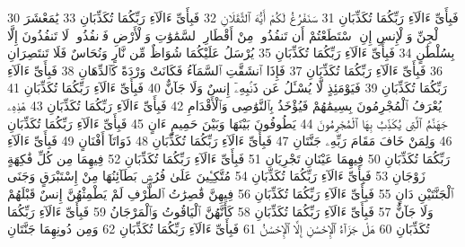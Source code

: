 {\tiny\colorbox{cl_aya}{30}} فَبِأَىِّ ءَالَآءِ رَبِّكُمَا تُكَذِّبَانِ
{\tiny\colorbox{cl_aya}{31}} سَنَفْرُغُ لَكُمْ أَيُّهَ ٱلثَّقَلَانِ
{\tiny\colorbox{cl_aya}{32}} فَبِأَىِّ ءَالَآءِ رَبِّكُمَا تُكَذِّبَانِ
{\tiny\colorbox{cl_aya}{33}} يَٰمَعْشَرَ ٱلْجِنِّ وَٱلْإِنسِ إِنِ ٱسْتَطَعْتُمْ أَن تَنفُذُوا۟ مِنْ أَقْطَارِ ٱلسَّمَٰوَٰتِ وَٱلْأَرْضِ فَٱنفُذُوا۟ لَا تَنفُذُونَ إِلَّا بِسُلْطَٰنٍ
{\tiny\colorbox{cl_aya}{34}} فَبِأَىِّ ءَالَآءِ رَبِّكُمَا تُكَذِّبَانِ
{\tiny\colorbox{cl_aya}{35}} يُرْسَلُ عَلَيْكُمَا شُوَاظٌ مِّن نَّارٍ وَنُحَاسٌ فَلَا تَنتَصِرَانِ
{\tiny\colorbox{cl_aya}{36}} فَبِأَىِّ ءَالَآءِ رَبِّكُمَا تُكَذِّبَانِ
{\tiny\colorbox{cl_aya}{37}} فَإِذَا ٱنشَقَّتِ ٱلسَّمَآءُ فَكَانَتْ وَرْدَةً كَٱلدِّهَانِ
{\tiny\colorbox{cl_aya}{38}} فَبِأَىِّ ءَالَآءِ رَبِّكُمَا تُكَذِّبَانِ
{\tiny\colorbox{cl_aya}{39}} فَيَوْمَئِذٍ لَّا يُسْـَٔلُ عَن ذَنۢبِهِۦٓ إِنسٌ وَلَا جَآنٌّ
{\tiny\colorbox{cl_aya}{40}} فَبِأَىِّ ءَالَآءِ رَبِّكُمَا تُكَذِّبَانِ
{\tiny\colorbox{cl_aya}{41}} يُعْرَفُ ٱلْمُجْرِمُونَ بِسِيمَٰهُمْ فَيُؤْخَذُ بِٱلنَّوَٰصِى وَٱلْأَقْدَامِ
{\tiny\colorbox{cl_aya}{42}} فَبِأَىِّ ءَالَآءِ رَبِّكُمَا تُكَذِّبَانِ
{\tiny\colorbox{cl_aya}{43}} هَٰذِهِۦ جَهَنَّمُ ٱلَّتِى يُكَذِّبُ بِهَا ٱلْمُجْرِمُونَ
{\tiny\colorbox{cl_aya}{44}} يَطُوفُونَ بَيْنَهَا وَبَيْنَ حَمِيمٍ ءَانٍ
{\tiny\colorbox{cl_aya}{45}} فَبِأَىِّ ءَالَآءِ رَبِّكُمَا تُكَذِّبَانِ
{\tiny\colorbox{cl_aya}{46}} وَلِمَنْ خَافَ مَقَامَ رَبِّهِۦ جَنَّتَانِ
{\tiny\colorbox{cl_aya}{47}} فَبِأَىِّ ءَالَآءِ رَبِّكُمَا تُكَذِّبَانِ
{\tiny\colorbox{cl_aya}{48}} ذَوَاتَآ أَفْنَانٍ
{\tiny\colorbox{cl_aya}{49}} فَبِأَىِّ ءَالَآءِ رَبِّكُمَا تُكَذِّبَانِ
{\tiny\colorbox{cl_aya}{50}} فِيهِمَا عَيْنَانِ تَجْرِيَانِ
{\tiny\colorbox{cl_aya}{51}} فَبِأَىِّ ءَالَآءِ رَبِّكُمَا تُكَذِّبَانِ
{\tiny\colorbox{cl_aya}{52}} فِيهِمَا مِن كُلِّ فَٰكِهَةٍ زَوْجَانِ
{\tiny\colorbox{cl_aya}{53}} فَبِأَىِّ ءَالَآءِ رَبِّكُمَا تُكَذِّبَانِ
{\tiny\colorbox{cl_aya}{54}} مُتَّكِـِٔينَ عَلَىٰ فُرُشٍۭ بَطَآئِنُهَا مِنْ إِسْتَبْرَقٍ وَجَنَى ٱلْجَنَّتَيْنِ دَانٍ
{\tiny\colorbox{cl_aya}{55}} فَبِأَىِّ ءَالَآءِ رَبِّكُمَا تُكَذِّبَانِ
{\tiny\colorbox{cl_aya}{56}} فِيهِنَّ قَٰصِرَٰتُ ٱلطَّرْفِ لَمْ يَطْمِثْهُنَّ إِنسٌ قَبْلَهُمْ وَلَا جَآنٌّ
{\tiny\colorbox{cl_aya}{57}} فَبِأَىِّ ءَالَآءِ رَبِّكُمَا تُكَذِّبَانِ
{\tiny\colorbox{cl_aya}{58}} كَأَنَّهُنَّ ٱلْيَاقُوتُ وَٱلْمَرْجَانُ
{\tiny\colorbox{cl_aya}{59}} فَبِأَىِّ ءَالَآءِ رَبِّكُمَا تُكَذِّبَانِ
{\tiny\colorbox{cl_aya}{60}} هَلْ جَزَآءُ ٱلْإِحْسَٰنِ إِلَّا ٱلْإِحْسَٰنُ
{\tiny\colorbox{cl_aya}{61}} فَبِأَىِّ ءَالَآءِ رَبِّكُمَا تُكَذِّبَانِ
{\tiny\colorbox{cl_aya}{62}} وَمِن دُونِهِمَا جَنَّتَانِ
